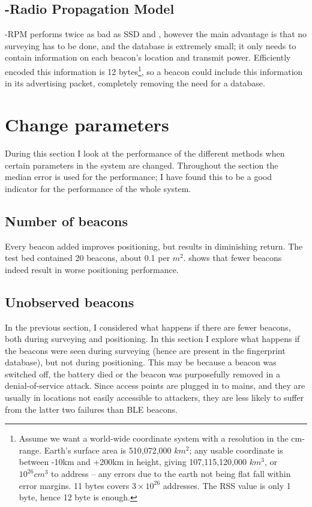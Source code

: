 \subsection{\BRP-Radio Propagation Model}
\aBRP-RPM performs twice as bad as SSD and \aBRP, however the main advantage is that no surveying has to be done, and the database is extremely small; it only needs to contain information on each beacon's location and transmit power.
Efficiently encoded this information is 12 bytes\footnote{
    Assume we want a world-wide coordinate system with a resolution in the cm-range.
    Earth's surface area is 510,072,000 $km^2$; any usable coordinate is between -10km and +200km in height, giving 107,115,120,000 $km^3$, or $10^{26} cm^3$ to address -- any errors due to the earth not being flat fall within error margins.
    11 bytes covers $3\times 10^{26}$ addresses.
    The RSS value is only 1 byte, hence 12 byte is enough.
}, so a beacon could include this information in its advertising packet, completely removing the need for a database.



\section{Change parameters}
During this section I look at the performance of the different methods when certain parameters in the system are changed.
Throughout the section the median error is used for the performance; I have found this to be a good indicator for the performance of the whole system.

\subsection{Number of beacons}
Every beacon added improves positioning, but results in diminishing return.
The test bed contained 20 beacons, about 0.1 per $m^2$.
 shows that fewer beacons indeed result in worse positioning performance.


\subsection{Unobserved beacons}
\label{sec:architecture-dying-beacons}
In the previous section, I considered what happens if there are fewer beacons, both during surveying and positioning.
In this section I explore what happens if the beacons were seen during surveying (hence are present in the fingerprint database), but not during positioning.
This may be because a beacon was switched off, the battery died or the beacon was purposefully removed in a denial-of-service attack.
Since \wifi access points are plugged in to mains, and they are usually in locations not easily accessible to attackers, they are less likely to suffer from the latter two failures than BLE beacons.

